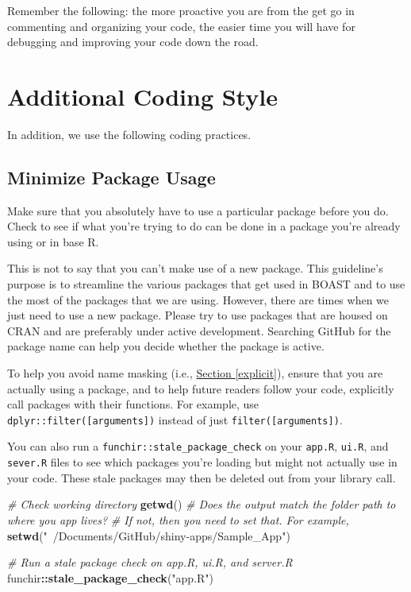 \documentclass[
]{book}
\newenvironment{Shaded}{\begin{snugshade}}{\end{snugshade}}
\newcommand{\CommentTok}[1]{\textcolor[rgb]{0.56,0.35,0.01}{\textit{#1}}}
\newcommand{\KeywordTok}[1]{\textcolor[rgb]{0.13,0.29,0.53}{\textbf{#1}}}
\newcommand{\NormalTok}[1]{#1}
\newcommand{\OperatorTok}[1]{\textcolor[rgb]{0.81,0.36,0.00}{\textbf{#1}}}
\newcommand{\StringTok}[1]{\textcolor[rgb]{0.31,0.60,0.02}{#1}}
\begin{document}
Remember the following: the more proactive you are from the get go in commenting and organizing your code, the easier time you will have for debugging and improving your code down the road.

\hypertarget{additional-coding-style}{%
\section{Additional Coding Style}\label{additional-coding-style}}

In addition, we use the following coding practices.

\hypertarget{minPackages}{%
\subsection{Minimize Package Usage}\label{minPackages}}

Make sure that you absolutely have to use a particular package before you do. Check to see if what you're trying to do can be done in a package you're already using or in base R.

This is not to say that you can't make use of a new package. This guideline's purpose is to streamline the various packages that get used in BOAST and to use the most of the packages that we are using. However, there are times when we just need to use a new package. Please try to use packages that are housed on CRAN and are preferably under active development. Searching GitHub for the package name can help you decide whether the package is active.

To help you avoid name masking (i.e., \protect\hyperlink{explicit}{Section \ref{explicit}}), ensure that you are actually using a package, and to help future readers follow your code, explicitly call packages with their functions. For example, use \texttt{dplyr::filter({[}arguments{]})} instead of just \texttt{filter({[}arguments{]})}.

You can also run a \texttt{funchir::stale\_package\_check} on your \texttt{app.R}, \texttt{ui.R}, and \texttt{sever.R} files to see which packages you're loading but might not actually use in your code. These stale packages may then be deleted out from your library call.

\begin{Shaded}
\begin{Highlighting}[]
\CommentTok{# Check working directory}
\KeywordTok{getwd}\NormalTok{()}
\CommentTok{# Does the output match the folder path to where you app lives?}
\CommentTok{# If not, then you need to set that. For example,}
\KeywordTok{setwd}\NormalTok{(}\StringTok{"~/Documents/GitHub/shiny-apps/Sample_App"}\NormalTok{)}

\CommentTok{# Run a stale package check on app.R, ui.R, and server.R}
\NormalTok{funchir}\OperatorTok{::}\KeywordTok{stale_package_check}\NormalTok{(}\StringTok{"app.R"}\NormalTok{)}
\end{Highlighting}
\end{Shaded}
\end{document}
